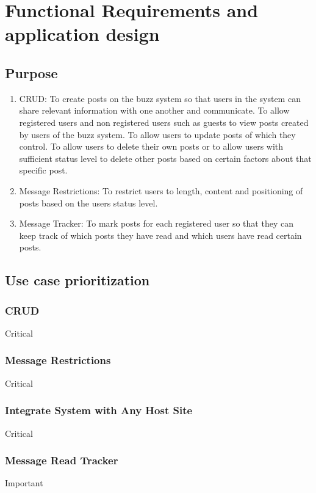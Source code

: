 \documentclass[12pt, oneside]{book}
\begin{document}
\section{Functional Requirements and application design}

\subsection{Purpose}
\begin{enumerate}
 \item{CRUD}: To create posts on the buzz system so that users in the system can share relevant information with one another and communicate. To allow registered users and non registered users such as guests to view posts created by users of the buzz system. To allow users to update posts of which they control. To allow users to delete their own posts or to allow users with sufficient status level to delete other posts based on certain factors about that specific post.
 \\
\item{Message Restrictions}: To restrict users to length, content and positioning of posts based on the users status level. 
\\
 \item{Message Tracker}: To mark posts for each registered user so that they can keep track of which posts they have read and which users have read certain posts.
\\

 
\end{enumerate}

\subsection{Use case prioritization}
\subsubsection{CRUD}
Critical
\subsubsection{Message Restrictions}
Critical
\subsubsection{Integrate System with Any Host Site}
Critical
\subsubsection{Message Read Tracker}
Important
\end{document}
